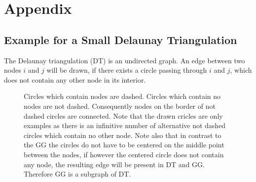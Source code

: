 \section{Appendix}
\subsection{Example for a Small Delaunay Triangulation}
\label{appendix:DT_def}
    The Delaunay triangulation (DT) is an undirected graph. An edge
    between two nodes \(i\) and \(j\) will be drawn, if there exists
    a circle passing through \(i\) and \(j\), which does not contain
    any other node in its interior.
    \begin{figure}[htbp]
    \centering
        
        \caption[Example for a Small Delaunay Triangulation]
        {
            Circles which contain nodes are dashed.
            Circles which contain no nodes are not dashed.
            Consequently nodes on the border of not dashed circles are
            connected. Note that the drawn cricles are only examples
            as there is an infinitive number of alternative not
            dashed circles which contain no other node.
            Note also that in contrast to the GG the circles do not
            have to be centered on the middle point between the nodes, if
            however the centered circle does not contain any node, the
            resulting edge will be present in DT and GG. Therefore GG is
            a subgraph of DT.
        }
        \label{fig:def:DT}
    \end{figure}

